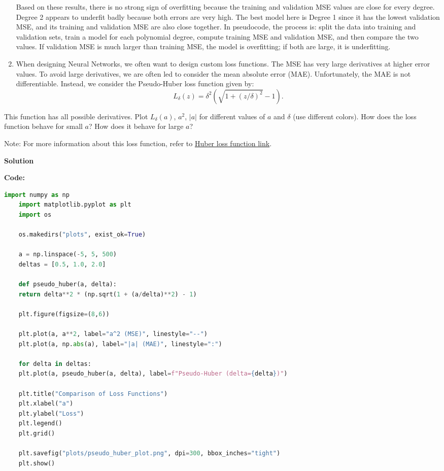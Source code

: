 \documentclass[10pt]{article}
\begin{document}
\begin{enumerate}[label=\textbf{1(\alph*)}]
Based on these results, there is no strong sign of overfitting because the training and validation MSE values are close for every degree. Degree 2 appears to underfit badly because both errors are very high. The best model here is Degree 1 since it has the lowest validation MSE, and its training and validation MSE are also close together. In pseudocode, the process is: split the data into training and validation sets, train a model for each polynomial degree, compute training MSE and validation MSE, and then compare the two values. If validation MSE is much larger than training MSE, the model is overfitting; if both are large, it is underfitting.

    \item When designing Neural Networks, we often want to design custom loss functions. The MSE has very large derivatives at higher error values. To avoid large derivatives, we are often led to consider the mean absolute error (MAE). Unfortunately, the MAE is not differentiable. Instead, we consider the Pseudo-Huber loss function given by:
    \[
    L_{\delta}(z)=\delta^2\left(\sqrt{1+(z/\delta)^2}-1\right).
    \]
\end{enumerate}

This function has all possible derivatives. Plot $L_{\delta}(a)$, $a^2$, $|a|$ for different values of $a$ and $\delta$ (use different colors). How does the loss function behave for small $a$? How does it behave for large $a$?

Note: For more information about this loss function, refer to \href{https://en.wikipedia.org/wiki/Huber_loss}{Huber loss function link}.

\textbf{Solution}

\textbf{Code:}
\begin{lstlisting}[language=Python]
	import numpy as np
	import matplotlib.pyplot as plt
	import os
	
	os.makedirs("plots", exist_ok=True)
	
	a = np.linspace(-5, 5, 500)
	deltas = [0.5, 1.0, 2.0]
	
	def pseudo_huber(a, delta):
	return delta**2 * (np.sqrt(1 + (a/delta)**2) - 1)
	
	plt.figure(figsize=(8,6))
	
	plt.plot(a, a**2, label="a^2 (MSE)", linestyle="--")
	plt.plot(a, np.abs(a), label="|a| (MAE)", linestyle=":")
	
	for delta in deltas:
	plt.plot(a, pseudo_huber(a, delta), label=f"Pseudo-Huber (delta={delta})")
	
	plt.title("Comparison of Loss Functions")
	plt.xlabel("a")
	plt.ylabel("Loss")
	plt.legend()
	plt.grid()
	
	plt.savefig("plots/pseudo_huber_plot.png", dpi=300, bbox_inches="tight")
	plt.show()
\end{lstlisting}
\end{document}
